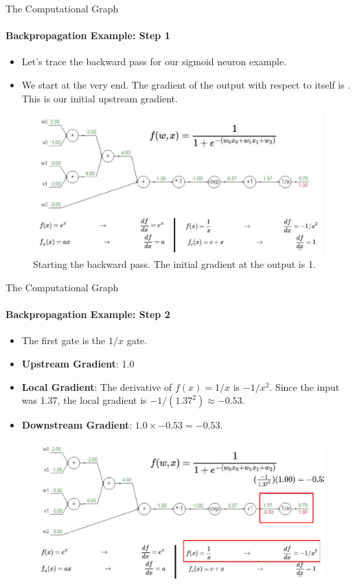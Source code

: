 \begin{frame}{The Computational Graph}
    \framesubtitle{Backpropagation Example: Step 1}
    \begin{itemize}
        \item Let's trace the backward pass for our sigmoid neuron example.
        \item We start at the very end. The gradient of the output with respect to itself is . This is our initial upstream gradient.
    \end{itemize}
    \begin{figure}
        \centering
        \includegraphics[width=\linewidth]{images/sigmoid_backprop_1.png}
        \caption{Starting the backward pass. The initial gradient at the output is 1.}
    \end{figure}
\end{frame}

\begin{frame}{The Computational Graph}
    \framesubtitle{Backpropagation Example: Step 2}
    \small
    \begin{itemize}
        \item The first gate is the $1/x$ gate.
        \item \textbf{Upstream Gradient}: 1.0
        \item \textbf{Local Gradient}: The derivative of $f(x) = 1/x$ is $-1/x^2$. Since the input was 1.37, the local gradient is $-1/(1.37^2) \approx -0.53$.
        \item \textbf{Downstream Gradient}: $1.0 \times -0.53 = -0.53$.
    \end{itemize}
    \begin{figure}
        \centering
        \includegraphics[width=0.9\linewidth]{images/sigmoid_backprop_2.png}
    \end{figure}
\end{frame}

